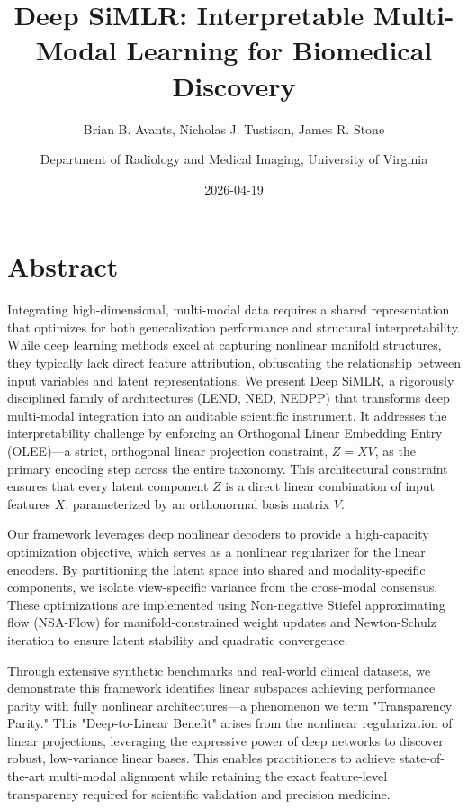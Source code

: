 \documentclass[
  letterpaper,
]{report}
\title{Deep SiMLR: Interpretable Multi-Modal Learning for Biomedical
Discovery}
\subtitle{Brian B. Avants, Nicholas J. Tustison, James R. Stone}
\author{Department of Radiology and Medical Imaging, University of
Virginia}
\date{2026-04-19}
\renewcommand*\contentsname{Table of contents}
\newcommand\contentsname{Table of contents}
\begin{document}
\maketitle

\renewcommand*\contentsname{Table of contents}
{
\setcounter{tocdepth}{2}
\tableofcontents
}


\chapter*{Abstract}\label{abstract}


Integrating high-dimensional, multi-modal data requires a shared
representation that optimizes for both generalization performance and
structural interpretability. While deep learning methods excel at
capturing nonlinear manifold structures, they typically lack direct
feature attribution, obfuscating the relationship between input
variables and latent representations. We present Deep SiMLR, a
rigorously disciplined family of architectures (LEND, NED, NEDPP) that
transforms deep multi-modal integration into an auditable scientific
instrument. It addresses the interpretability challenge by enforcing an
Orthogonal Linear Embedding Entry (OLEE)---a strict, orthogonal linear
projection constraint, \(Z = XV\), as the primary encoding step across
the entire taxonomy. This architectural constraint ensures that every
latent component \(Z\) is a direct linear combination of input features
\(X\), parameterized by an orthonormal basis matrix \(V\).

Our framework leverages deep nonlinear decoders to provide a
high-capacity optimization objective, which serves as a nonlinear
regularizer for the linear encoders. By partitioning the latent space
into shared and modality-specific components, we isolate view-specific
variance from the cross-modal consensus. These optimizations are
implemented using Non-negative Stiefel approximating flow (NSA-Flow) for
manifold-constrained weight updates and Newton-Schulz iteration to
ensure latent stability and quadratic convergence.

Through extensive synthetic benchmarks and real-world clinical datasets,
we demonstrate this framework identifies linear subspaces achieving
performance parity with fully nonlinear architectures---a phenomenon we
term "Transparency Parity." This "Deep-to-Linear Benefit" arises from
the nonlinear regularization of linear projections, leveraging the
expressive power of deep networks to discover robust, low-variance
linear bases. This enables practitioners to achieve state-of-the-art
multi-modal alignment while retaining the exact feature-level
transparency required for scientific validation and precision medicine.
\end{document}

